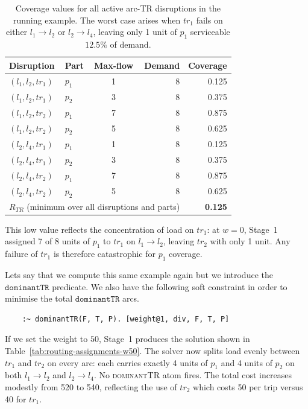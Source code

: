 \documentclass{article}
\begin{document}
\begin{table}[h]
\centering
\begin{tabular}{|l|l|c|r|r|}
\hline
\textbf{Disruption} & \textbf{Part} &
\textbf{Max-flow} & \textbf{Demand} & \textbf{Coverage} \\
\hline
$(l_1,l_2,tr_1)$ & $p_1$ & 1 & 8 & 0.125 \\
$(l_1,l_2,tr_1)$ & $p_2$ & 3 & 8 & 0.375 \\
$(l_1,l_2,tr_2)$ & $p_1$ & 7 & 8 & 0.875 \\
$(l_1,l_2,tr_2)$ & $p_2$ & 5 & 8 & 0.625 \\
$(l_2,l_4,tr_1)$ & $p_1$ & 1 & 8 & 0.125 \\
$(l_2,l_4,tr_1)$ & $p_2$ & 3 & 8 & 0.375 \\
$(l_2,l_4,tr_2)$ & $p_1$ & 7 & 8 & 0.875 \\
$(l_2,l_4,tr_2)$ & $p_2$ & 5 & 8 & 0.625 \\
\hline
\multicolumn{4}{l}{$R_{TR}$ (minimum over all disruptions
and parts)} & \textbf{0.125} \\
\hline
\end{tabular}
\caption{Coverage values for all active arc-TR disruptions
in the running example. The worst case arises when $tr_1$
fails on either $l_1 \to l_2$ or $l_2 \to l_4$, leaving
only 1 unit of $p_1$ serviceable $12.5\%$ of demand.}
\label{tab:rtr-disruptions}
\end{table}

This low value reflects the concentration of load on $tr_1$:
at $w=0$, Stage~1 assigned 7 of 8 units of $p_1$ to $tr_1$
on $l_1 \to l_2$, leaving $tr_2$ with only 1 unit. Any
failure of $tr_1$ is therefore catastrophic for $p_1$
coverage.

Lets say that we compute this same example again but we introduce the $\texttt{dominantTR}$ predicate. We also have the following soft constraint in order to minimise the total $\texttt{dominantTR}$ arcs.
\begin{lstlisting}
    :~ dominantTR(F, T, P). [weight@1, div, F, T, P]
\end{lstlisting}

If we set the weight to $50$, Stage~1 produces the solution shown
in Table~\ref{tab:routing-assignments-w50}. The solver now splits
load evenly between $tr_1$ and $tr_2$ on every arc: each carries
exactly 4 units of $p_1$ and 4 units of $p_2$ on both
$l_1 \to l_2$ and $l_2 \to l_4$. No \textsc{dominantTR} atom
fires. The total cost increases modestly from 520 to 540, reflecting
the use of $tr_2$ which costs 50 per trip versus 40 for $tr_1$.
\end{document}
